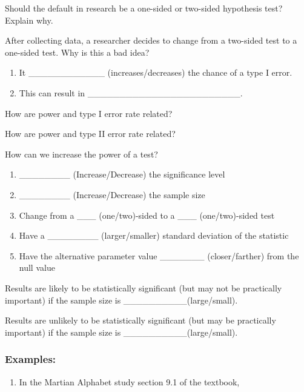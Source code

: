 \documentclass[
]{report}
\providecommand{\tightlist}{%
  \setlength{\itemsep}{0pt}\setlength{\parskip}{0pt}}
\newcommand{\rgs}{\vspace{12pt}} %
\begin{document}
Should the default in research be a one-sided or two-sided hypothesis test? Explain why.
\rgs
\rgs

After collecting data, a researcher decides to change from a two-sided test to a one-sided test. Why is this a bad idea?

\begin{enumerate}
\def\labelenumi{\arabic{enumi}.}
\item
  It \_\_\_\_\_\_\_\_\_\_\_\_ (increases/decreases) the chance of a type I error.
\item
  This can result in \_\_\_\_\_\_\_\_\_\_\_\_\_\_\_\_\_\_\_\_\_\_\_\_.
  \rgs
\end{enumerate}

How are power and type I error rate related?
\rgs

How are power and type II error rate related?
\rgs

How can we increase the power of a test?

\begin{enumerate}
\def\labelenumi{\arabic{enumi}.}
\item
  \_\_\_\_\_\_\_\_ (Increase/Decrease) the significance level
  \rgs
\item
  \_\_\_\_\_\_\_\_ (Increase/Decrease) the sample size
  \rgs
\item
  Change from a \_\_\_ (one/two)-sided to a \_\_\_ (one/two)-sided test
  \rgs
\item
  Have a \_\_\_\_\_\_\_\_ (larger/smaller) standard deviation of the statistic
  \rgs
\item
  Have the alternative parameter value \_\_\_\_\_\_\_ (closer/farther) from the null value
  \rgs
\end{enumerate}

Results are likely to be statistically significant (but may not be practically important) if the sample size is \_\_\_\_\_\_\_\_\_\_(large/small).
\rgs

Results are unlikely to be statistically significant (but may be practically important) if the sample size is \_\_\_\_\_\_\_\_\_\_(large/small).
\rgs

\hypertarget{examples}{%
\subsubsection*{Examples:}\label{examples}}

\begin{enumerate}
\def\labelenumi{\arabic{enumi}.}
\tightlist
\item
  In the Martian Alphabet study section 9.1 of the textbook,
\end{enumerate}
\end{document}

